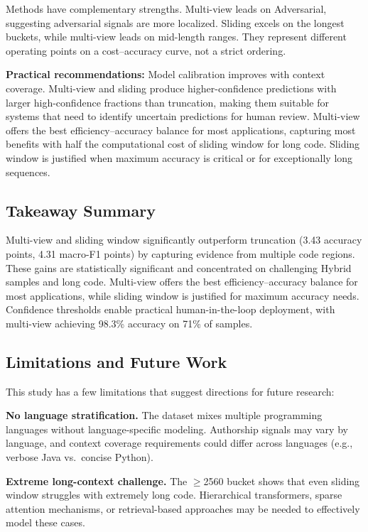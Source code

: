 \documentclass[conference]{IEEEtran}
\begin{document}
Methods have complementary strengths. Multi-view leads on Adversarial, suggesting adversarial signals are more localized. Sliding excels on the longest buckets, while multi-view leads on mid-length ranges. They represent different operating points on a cost--accuracy curve, not a strict ordering.

\textbf{Practical recommendations:} Model calibration improves with context coverage. Multi-view and sliding produce higher-confidence predictions with larger high-confidence fractions than truncation, making them suitable for systems that need to identify uncertain predictions for human review. Multi-view offers the best efficiency--accuracy balance for most applications, capturing most benefits with half the computational cost of sliding window for long code. Sliding window is justified when maximum accuracy is critical or for exceptionally long sequences.

\subsection{Takeaway Summary}

Multi-view and sliding window significantly outperform truncation (3.43 accuracy points, 4.31 macro-F1 points) by capturing evidence from multiple code regions. These gains are statistically significant and concentrated on challenging Hybrid samples and long code. Multi-view offers the best efficiency--accuracy balance for most applications, while sliding window is justified for maximum accuracy needs. Confidence thresholds enable practical human-in-the-loop deployment, with multi-view achieving 98.3\% accuracy on 71\% of samples.

\subsection{Limitations and Future Work}

This study has a few limitations that suggest directions for future research:

\textbf{No language stratification.} The dataset mixes multiple programming languages without language-specific modeling. Authorship signals may vary by language, and context coverage requirements could differ across languages (e.g., verbose Java vs.\ concise Python).

\textbf{Extreme long-context challenge.} The $\geq$2560 bucket shows that even sliding window struggles with extremely long code. Hierarchical transformers, sparse attention mechanisms, or retrieval-based approaches may be needed to effectively model these cases.
\end{document}
